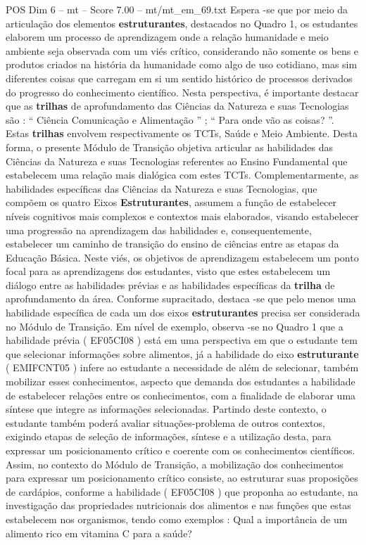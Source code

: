 \begin{textsample}{POS Dim 6 – mt – Score 7.00 – mt/mt\_em\_69.txt}
Espera -se que por meio da articulação dos elementos \textbf{estruturantes}, destacados no Quadro 1, os estudantes elaborem um processo de aprendizagem onde a relação humanidade e meio ambiente seja observada com um viés crítico, considerando não somente os bens e produtos criados na história da humanidade como algo de uso cotidiano, mas sim diferentes coisas que carregam em si um sentido histórico de processos derivados do progresso do conhecimento científico.
Nesta perspectiva, é importante destacar que as \textbf{trilhas} de aprofundamento das Ciências da Natureza e suas Tecnologias são : “ Ciência Comunicação e Alimentação ” ; “ Para onde vão as coisas? ”.
Estas \textbf{trilhas} envolvem respectivamente os TCTs, Saúde e Meio Ambiente.
Desta forma, o presente Módulo de Transição objetiva articular as habilidades das Ciências da Natureza e suas Tecnologias referentes ao Ensino Fundamental que estabelecem uma relação mais dialógica com estes TCTs.
Complementarmente, as habilidades específicas das Ciências da Natureza e suas Tecnologias, que compõem os quatro Eixos \textbf{Estruturantes}, assumem a função de estabelecer níveis cognitivos mais complexos e contextos mais elaborados, visando estabelecer uma progressão na aprendizagem das habilidades e, consequentemente, estabelecer um caminho de transição do ensino de ciências entre as etapas da Educação Básica.
Neste viés, os objetivos de aprendizagem estabelecem um ponto focal para as aprendizagens dos estudantes, visto que estes estabelecem um diálogo entre as habilidades prévias e as habilidades específicas da \textbf{trilha} de aprofundamento da área.
Conforme supracitado, destaca -se que pelo menos uma habilidade específica de cada um dos eixos \textbf{estruturantes} precisa ser considerada no Módulo de Transição.
Em nível de exemplo, observa -se no Quadro 1 que a habilidade prévia ( EF05CI08 ) está em uma perspectiva em que o estudante tem que selecionar informações sobre alimentos, já a habilidade do eixo \textbf{estruturante} ( EMIFCNT05 ) infere ao estudante a necessidade de além de selecionar, também mobilizar esses conhecimentos, aspecto que demanda dos estudantes a habilidade de estabelecer relações entre os conhecimentos, com a finalidade de elaborar uma síntese que integre as informações selecionadas.
Partindo deste contexto, o estudante também poderá avaliar situações-problema de outros contextos, exigindo etapas de seleção de informações, síntese e a utilização desta, para expressar um posicionamento crítico e coerente com os conhecimentos científicos.
Assim, no contexto do Módulo de Transição, a mobilização dos conhecimentos para expressar um posicionamento crítico consiste, ao estruturar suas proposições de cardápios, conforme a habilidade ( EF05CI08 ) que proponha ao estudante, na investigação das propriedades nutricionais dos alimentos e nas funções que estas estabelecem nos organismos, tendo como exemplos : Qual a importância de um alimento rico em vitamina C para a saúde?

\end{textsample}
